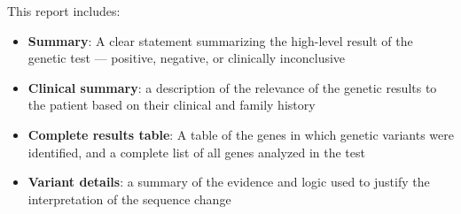 \documentclass[9pt,a4paper]{article}
\begin{document}
This report includes:
\begin{itemize}[leftmargin=0.4cm]
  \item \textbf{Summary}: A clear statement summarizing the high-level result of the genetic test — positive, negative, or clinically inconclusive
  \item \textbf{Clinical summary}: a description of the relevance of the genetic results to the patient based on their clinical and family history
  \item \textbf{Complete results table}: A table of the genes in which genetic variants were identified, and a complete list of all genes analyzed in the test
  \item \textbf{Variant details}: a summary of the evidence and logic used to justify the interpretation of the sequence change
\end{itemize}

\par\null\par




\end{document}
